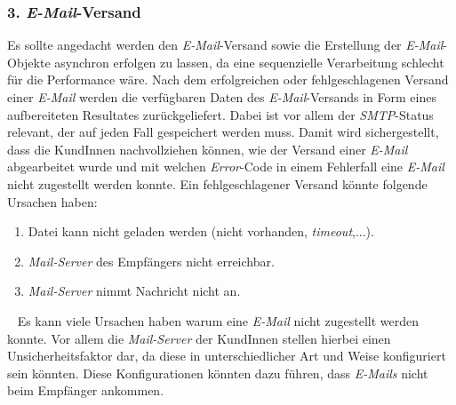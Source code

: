 \subsubsection{3. \emph{E-Mail}-Versand}
Es sollte angedacht werden den \emph{E-Mail}-Versand sowie die Erstellung der \emph{E-Mail}-Objekte asynchron erfolgen zu lassen, da eine sequenzielle Verarbeitung schlecht für die Performance wäre. Nach dem erfolgreichen oder fehlgeschlagenen Versand einer \emph{E-Mail} werden die verfügbaren Daten des \emph{E-Mail}-Versands in Form eines aufbereiteten Resultates zurückgeliefert. Dabei ist vor allem der \emph{SMTP}-Status relevant, der auf jeden Fall gespeichert werden muss. Damit wird sichergestellt, dass die KundInnen nachvollziehen können, wie der Versand einer \emph{E-Mail} abgearbeitet wurde und mit welchen \emph{Error}-Code in einem Fehlerfall eine \emph{E-Mail} nicht zugestellt werden konnte. Ein fehlgeschlagener Versand könnte folgende Ursachen haben:
\begin{enumerate}
	\item Datei kann nicht geladen werden (nicht vorhanden, \emph{timeout},...).
	\item \emph{Mail-Server} des Empfängers nicht erreichbar.
	\item \emph{Mail-Server} nimmt Nachricht nicht an.
\end{enumerate}
\ \newline
Es kann viele Ursachen haben warum eine \emph{E-Mail} nicht zugestellt werden konnte. Vor allem die \emph{Mail-Server} der KundInnen stellen hierbei einen Unsicherheitsfaktor dar, da diese in unterschiedlicher Art und Weise konfiguriert sein könnten. Diese Konfigurationen könnten dazu führen, dass \emph{E-Mails} nicht beim Empfänger ankommen.

\newpage

